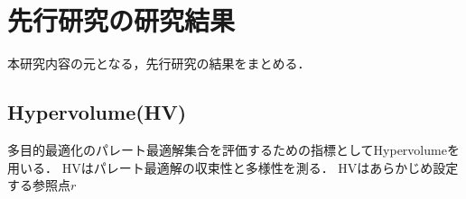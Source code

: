 \documentclass[main]{subfiles}
\begin{document}
    \chapter{先行研究の研究結果}
    本研究内容の元となる，先行研究の結果をまとめる\cite{senkoukenkyu}．

    \section{Hypervolume(HV)}
    多目的最適化のパレート最適解集合を評価するための指標としてHypervolumeを用いる\cite{hv}．
    HVはパレート最適解の収束性と多様性を測る．
    HVはあらかじめ設定する参照点\boldmath$r$
\end{document}
